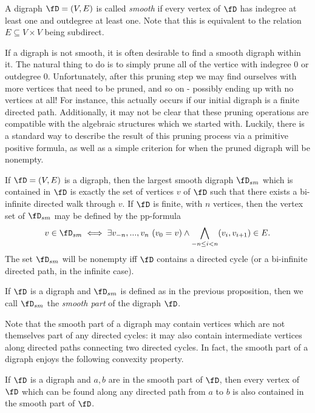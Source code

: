 \begin{defn} A digraph $\fD = (V,E)$ is called \emph{smooth} if every vertex of $\fD$ has indegree at least one and outdegree at least one. Note that this is equivalent to the relation $E \subseteq V\times V$ being subdirect.
\end{defn}

If a digraph is not smooth, it is often desirable to find a smooth digraph within it. The natural thing to do is to simply prune all of the vertice with indegree $0$ or outdegree $0$. Unfortunately, after this pruning step we may find ourselves with more vertices that need to be pruned, and so on - possibly ending up with no vertices at all! For instance, this actually occurs if our initial digraph is a finite directed path. Additionally, it may not be clear that these pruning operations are compatible with the algebraic structures which we started with. Luckily, there is a standard way to describe the result of this pruning process via a primitive positive formula, as well as a simple criterion for when the pruned digraph will be nonempty.

\begin{prop} If $\fD = (V,E)$ is a digraph, then the largest smooth digraph $\fD_{sm}$ which is contained in $\fD$ is exactly the set of vertices $v$ of $\fD$ such that there exists a bi-infinite directed walk through $v$. If $\fD$ is finite, with $n$ vertices, then the vertex set of $\fD_{sm}$ may be defined by the pp-formula
\[
v \in \fD_{sm} \iff \exists v_{-n}, ..., v_n\ (v_0 = v) \wedge \bigwedge_{-n \le i < n} (v_i,v_{i+1}) \in E.
\]
The set $\fD_{sm}$ will be nonempty iff $\fD$ contains a directed cycle (or a bi-infinite directed path, in the infinite case).
\end{prop}

\begin{defn} If $\fD$ is a digraph and $\fD_{sm}$ is defined as in the previous proposition, then we call $\fD_{sm}$ the \emph{smooth part} of the digraph $\fD$.
\end{defn}

Note that the smooth part of a digraph may contain vertices which are not themselves part of any directed cycles: it may also contain intermediate vertices along directed paths connecting two directed cycles. In fact, the smooth part of a digraph enjoys the following convexity property.

\begin{prop} If $\fD$ is a digraph and $a,b$ are in the smooth part of $\fD$, then every vertex of $\fD$ which can be found along any directed path from $a$ to $b$ is also contained in the smooth part of $\fD$.
\end{prop}

